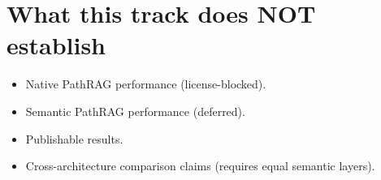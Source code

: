 \documentclass[11pt,a4paper]{article}
\begin{document}
\section{What this track does NOT establish}

\begin{itemize}[leftmargin=*]
    \item Native PathRAG performance (license-blocked).
    \item Semantic PathRAG performance (deferred).
    \item Publishable results.
    \item Cross-architecture comparison claims (requires equal semantic layers).
\end{itemize}
\end{document}
